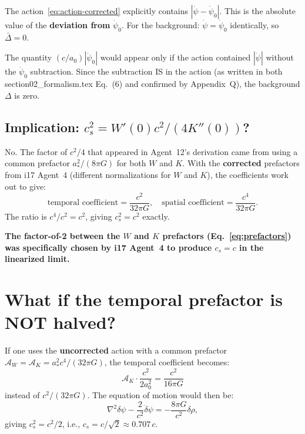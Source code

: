 \documentclass[aps,prd,twocolumn,nofootinbib]{revtex4-2}
\newcommand{\aM}{a_0}
\newcommand{\astar}{a_*}
\newcommand{\dpsi}{\delta\psi}
\begin{document}
The action~\eqref{eq:action-corrected} explicitly contains $|\dot\psi - \dot\psi_0|$.
This is the absolute value of the \textbf{deviation from} $\dot\psi_0$.
For the background: $\dot\psi = \dot\psi_0$ identically, so $\bar\Delta = 0$.

The quantity $(c/\aM)|\dot\psi_0|$ would appear only if the action
contained $|\dot\psi|$ without the $\dot\psi_0$ subtraction. Since the
subtraction IS in the action (as written in both section02\_formalism.tex
Eq.~(6) and confirmed by Appendix~Q), the background $\Delta$ is zero.

\subsection{Implication: $c_s^2 = W'(0) c^2/(4 K''(0))$?}

No. The factor of $c^2/4$ that appeared in Agent~12's derivation came from
using a common prefactor $\astar^2/(8\pi G)$ for both $W$ and $K$. With
the \textbf{corrected} prefactors from i17 Agent~4 (different normalizations
for $W$ and $K$), the coefficients work out to give:
\begin{equation}
\text{temporal coefficient} = \frac{c^2}{32\pi G},\quad
\text{spatial coefficient} = \frac{c^4}{32\pi G}.
\end{equation}
The ratio is $c^4/c^2 = c^2$, giving $c_s^2 = c^2$ exactly.

\textbf{The factor-of-2 between the $W$ and $K$ prefactors
(Eq.~\eqref{eq:prefactors}) was specifically chosen by i17 Agent~4
to produce $c_s = c$ in the linearized limit.}

\section{What if the temporal prefactor is NOT halved?}
\label{sec:alternative}

If one uses the \textbf{uncorrected} action with a common prefactor
$\mathcal{A}_W = \mathcal{A}_K = \astar^2 c^4/(32\pi G)$, the temporal
coefficient becomes:
\begin{equation}
\mathcal{A}_K \cdot \frac{c^2}{2\aM^2} = \frac{c^2}{16\pi G}
\end{equation}
instead of $c^2/(32\pi G)$. The equation of motion would then be:
\begin{equation}
\nabla^2\dpsi - \frac{2}{c^2}\ddot\dpsi = -\frac{8\pi G}{c^2}\delta\rho,
\end{equation}
giving $c_s^2 = c^2/2$, i.e., $c_s = c/\sqrt{2} \approx 0.707\,c$.
\end{document}
